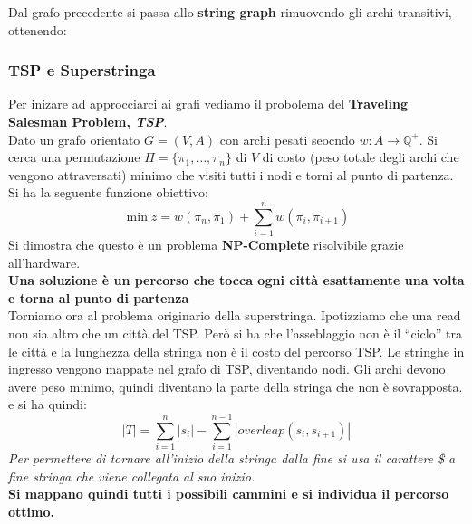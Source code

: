 \documentclass[a4paper,12pt, oneside]{book}
\begin{document}
\begin{center}
\end{center}
Dal grafo precedente si passa allo \textbf{string graph}
rimuovendo gli archi transitivi, ottenendo:
\begin{center}
\end{center}
\subsubsection{TSP e Superstringa}
Per inizare ad approcciarci ai grafi vediamo il probolema del
\textbf{Traveling Salesman Problem, \textit{TSP}}.\\
Dato un grafo orientato $G=(V,A)$ con archi pesati seocndo $w:A\to
\mathbb{Q}^+$. Si cerca una permutazione $\Pi=\{\pi_1,\ldots,\pi_n\}$
di $V$ di costo (peso totale degli archi che vengono attraversati)
minimo che visiti tutti i nodi e torni al punto di partenza. Si ha la
seguente funzione obiettivo:
\[\min z=w(\pi_n,\pi_1)+\sum_{i=1}^nw(\pi_i, \pi_{i+1})\]
Si dimostra che questo è un problema \textbf{NP-Complete} risolvibile
grazie all'hardware.\\
\textbf{Una soluzione è un percorso che tocca ogni città esattamente
  una volta e torna al punto di partenza}\\
Torniamo ora al problema originario della superstringa. Ipotizziamo
che una read non sia altro che un città del TSP. Però si ha che
l'asseblaggio non è il ``ciclo'' tra le città e la lunghezza della
stringa non è il costo del percorso TSP. Le stringhe in ingresso
vengono mappate nel grafo di TSP, diventando nodi. Gli archi devono
avere peso minimo, quindi diventano la parte della stringa che non è
sovrapposta. 
e si ha quindi:
\[|T|=\sum_{i=1}^n|s_i|-\sum_{i=1}^{n-1}|overleap(s_i,s_{i+1})|\]
\textit{Per permettere di tornare all'inizio della stringa dalla fine
  si usa il carattere \$ a fine stringa che viene collegata al suo
  inizio.}\\
\textbf{Si mappano quindi tutti i possibili cammini e si individua il
  percorso ottimo.}
\end{document}
